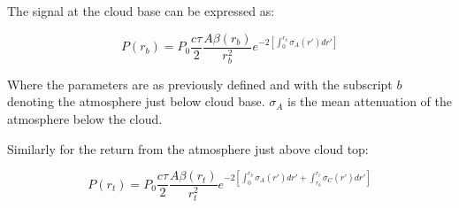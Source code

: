 
The signal at the cloud base can be expressed as:

\begin{equation}
P(r_b) = {P_0}
{\frac{c\tau}{2}}
{\frac{A{\beta}(r_b)}{r^{2}_{b}}}
e^
{-2[\int_0^{r_{b}}
{{\sigma_{A}}
(r\prime) dr\prime}]
}
\label{basepower}
\end{equation}

\noindent
Where the parameters are as previously defined and with
the subscript $b$ denoting the atmosphere just below cloud
base. $\sigma_{A}$ is the mean attenuation of the atmosphere
below the cloud.
% 
% 
% 

\noindent
Similarly for the return from the atmosphere just above
cloud top:

\begin{equation}
P(r_t)
= {P_0}
{\frac{c\tau}{2}}
{\frac{A{\beta}(r_t)}{r^{2}_{t}}}
e^{-2[
{\int_{0}^{r_{b}}}{\sigma_{A}}(r\prime) dr\prime + 
{\int_{r_{b}}^{r_{t}}}{\sigma_{C}}(r\prime) dr\prime
]}
\label{toppower}
\end{equation}


